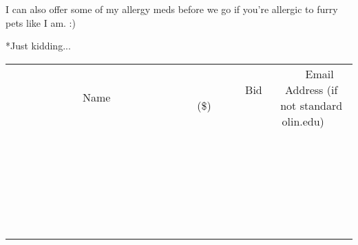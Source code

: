\documentclass[11pt]{article}
\begin{document}
I can also offer some of my allergy meds before we go if you're allergic to furry pets like I am. :)

*Just kidding...
\\[6ex]
\begin{tabular}{c c c}
~~~~~~~~~~~~~Name~~~~~~~~~~~~~ & ~~~~~~~~~Bid (\$)~~~~~~~~~  & ~~~Email Address (if not standard olin.edu)~~~\\
 & & \\
\hline
 & & \\
\hline
 & & \\
\hline
 & & \\
\hline
 & & \\
\hline
 & & \\
\hline
 & & \\
\hline
 & & \\
\hline
 & & \\
\hline
 & & \\
\hline
 & & \\
\hline
 & & \\
\hline
 & & \\
\hline
 & & \\
\hline
 & & \\
\hline
 & & \\
\hline
 & & \\
\hline
 & & \\
\hline
 & & \\
\hline
 & & \\
\hline
 & & \\
\hline
 & & \\
\hline
 & & \\
\hline
 & & \\
\hline
 & & \\
\hline
 & & \\
\hline
\end{tabular}
\newpage
\end{document}
